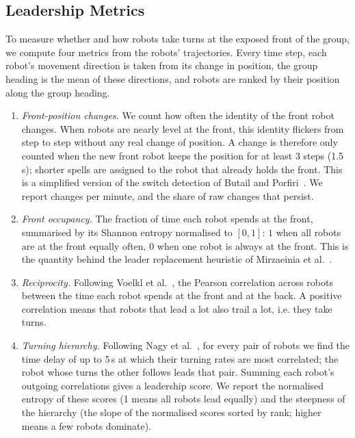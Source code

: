 \documentclass[runningheads]{llncs}
\begin{document}
\subsection{Leadership Metrics}
\label{sec:metrics}

To measure whether and how robots take turns at the exposed front of the group, we compute four metrics from the robots' trajectories. Every time step,
each robot's movement direction is taken from its change in position, the group heading is the mean of these directions, and robots are ranked by their position along the group heading. 
\begin{enumerate}
\item \emph{Front-position changes.} We count how often the identity of the front robot changes. When robots are nearly level at the front, this identity flickers from step to step without any real change of position. A change is therefore only counted when the new front robot keeps the position for at least 3 steps (1.5\,s); shorter spells are assigned to the robot that already holds the front. This is a simplified version of the switch detection of Butail and Porfiri~\cite{butail2019}. We report changes per minute, and the share of raw changes that persist.
\item \emph{Front occupancy.} The fraction of time each robot spends at the front, summarised by its Shannon entropy normalised to $[0, 1]$: $1$ when all robots are at the front equally often, $0$ when one robot is always at the front. This is the quantity behind the leader replacement heuristic of Mirzaeinia et al.~\cite{Mirzaeinia2019}.
\item \emph{Reciprocity.} Following Voelkl et al.~\cite{voelkl2015}, the Pearson correlation across robots between the time each robot spends at the front and at the back. A positive correlation means that robots that lead a lot also trail a lot, i.e. they take turns.
\item \emph{Turning hierarchy.} Following Nagy et al.~\cite{nagy2010}, for every pair of robots we find the time delay of up to 5\,s at which their turning rates are most correlated; the robot whose turns the other follows leads that pair. Summing each robot's outgoing correlations gives a leadership score. We report the normalised entropy of these scores (1 means all robots lead equally) and the steepness of the hierarchy (the slope of the normalised scores sorted by rank; higher means a few robots dominate).
\end{enumerate}
\end{document}
